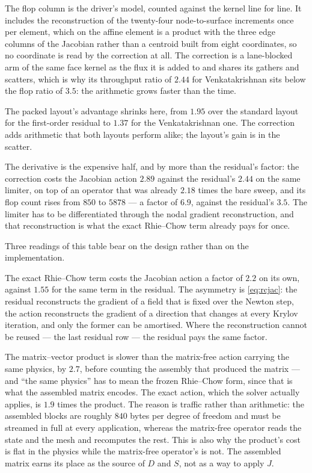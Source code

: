 \documentclass[11pt,a4paper]{article}
\begin{document}
The flop column is the driver's model, counted against the kernel line for line. It includes the
reconstruction of the twenty-four node-to-surface increments once per element, which on the
affine element is a product with the three edge columns of the Jacobian rather than a centroid
built from eight coordinates, so no coordinate is read by the correction at all. The correction
is a lane-blocked arm of the same face kernel as the flux it is added to and shares its gathers
and scatters, which is why its throughput ratio of $2.44$ for Venkatakrishnan sits below the
flop ratio of $3.5$: the arithmetic grows faster than the time.

The packed layout's advantage shrinks here, from $1.95$ over the standard layout for the
first-order residual to $1.37$ for the Venkatakrishnan one. The correction adds arithmetic that
both layouts perform alike; the layout's gain is in the scatter.

The derivative is the expensive half, and by more than the residual's factor: the correction
costs the Jacobian action $2.89$ against the residual's $2.44$ on the same limiter, on top of
an operator that was already $2.18$ times the bare sweep, and its flop count rises from $850$
to $5878$ --- a factor of $6.9$, against the residual's $3.5$. The limiter has to be
differentiated through the nodal gradient reconstruction, and that reconstruction is what the
exact Rhie--Chow term already pays for once.

Three readings of this table bear on the design rather than on the implementation.

The exact Rhie--Chow term costs the Jacobian action a factor of $2.2$ on its own, against
$1.55$ for the same term in the residual. The asymmetry is \eqref{eq:rcjac}: the residual
reconstructs the gradient of a field that is fixed over the Newton step, the action
reconstructs the gradient of a direction that changes at every Krylov iteration, and only the
former can be amortised. Where the reconstruction cannot be reused --- the last residual row
--- the residual pays the same factor.

The matrix--vector product is slower than the matrix-free action carrying the same physics,
by $2.7$, before counting the assembly that produced the matrix --- and ``the same physics''
has to mean the frozen Rhie--Chow form, since that is what the assembled matrix encodes. The
exact action, which the solver actually applies, is $1.9$ times the product. The reason is traffic
rather than arithmetic: the assembled blocks are roughly $840$ bytes per degree of freedom
and must be streamed in full at every application, whereas the matrix-free operator reads the
state and the mesh and recomputes the rest. This is also why the product's cost is flat in the
physics while the matrix-free operator's is not. The assembled matrix earns its place as the
source of $D$ and $S$, not as a way to apply $J$.
\end{document}
